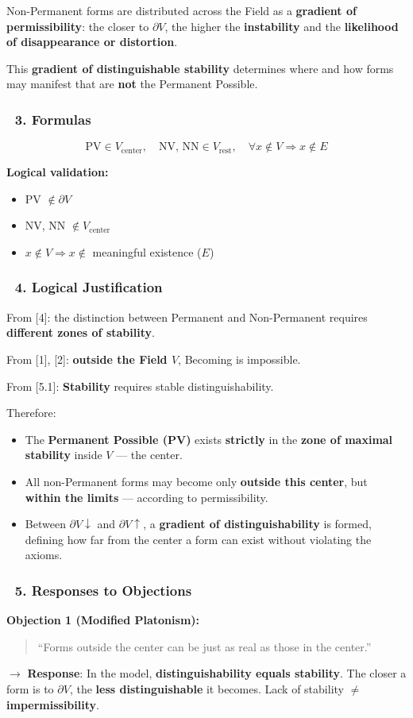 \documentclass[12pt]{article}
\begin{document}
Non-Permanent forms are distributed across the Field as a \textbf{gradient of permissibility}:
the closer to $\partial V$, the higher the \textbf{instability} and the \textbf{likelihood of disappearance or distortion}.

This \textbf{gradient of distinguishable stability} determines where and how forms may manifest that are \textbf{not} the Permanent Possible.

\subsubsection*{🔹 3. Formulas}
\[
\text{PV} \in V_\text{center}, \quad \text{NV},\, \text{NN} \in V_\text{rest}, \quad \forall x \notin V \Rightarrow x \notin E
\]

\bigskip
\textbf{Logical validation:}
\begin{itemize}
\item PV $\notin \partial V$
\item NV, NN $\notin V_\text{center}$
\item $x \notin V \Rightarrow x \notin$ meaningful existence ($E$)
\end{itemize}

\subsubsection*{🔹 4. Logical Justification}
From [4]: the distinction between Permanent and Non-Permanent requires \textbf{different zones of stability}.

From [1], [2]: \textbf{outside the Field $V$}, Becoming is impossible.

From [5.1]: \textbf{Stability} requires stable distinguishability.

\bigskip
Therefore:
\begin{itemize}
\item The \textbf{Permanent Possible (PV)} exists \textbf{strictly} in the \textbf{zone of maximal stability} inside $V$ — the center.
\item All non-Permanent forms may become only \textbf{outside this center}, but \textbf{within the limits} — according to permissibility.
\item Between $\partial V↓$ and $\partial V↑$, a \textbf{gradient of distinguishability} is formed, defining how far from the center a form can exist without violating the axioms.
\end{itemize}

\subsubsection*{🔹 5. Responses to Objections}
\textbf{Objection 1 (Modified Platonism):}
\begin{quote}
``Forms outside the center can be just as real as those in the center.''
\end{quote}
$\rightarrow$ \textbf{Response}:
In the model, \textbf{distinguishability equals stability}.
The closer a form is to $\partial V$, the \textbf{less distinguishable} it becomes.
Lack of stability $\neq$ \textbf{impermissibility}.
\end{document}
